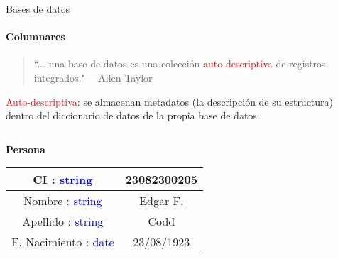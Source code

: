 \begin{frame}{Bases de datos}
    \framesubtitle{Columnares}

    \begin{overlayarea}{\linewidth}{\textheight}
        \begin{onlyenv}
            \begin{block}{}
            \begin{quote}
                ``... una base de datos es una colecci\'on \textcolor{red}{auto-descriptiva} de registros integrados."
                \hspace{1em plus 1fill}---Allen Taylor
            \end{quote}
    
            \textcolor{red}{Auto-descriptiva}: se almacenan metadatos (la descripci\'on de su estructura) dentro
            del diccionario de datos de la propia base de datos.
        \end{block}
      \end{onlyenv}
      
          \vspace{5mm}
      
        \begin{columns}
            \begin{column}[t]{0.5\textwidth}
          \centering

          \large \textbf{Persona}
          \vspace{2mm}

      \begin{tabular}{|c|c|}
          \hline
          CI : \textcolor{blue}{string} & 23082300205 \\ \hline
          Nombre : \textcolor{blue}{string} & Edgar F. \\\hline
          Apellido : \textcolor{blue}{string} & Codd \\\hline
          F. Nacimiento : \textcolor{blue}{date} & 23/08/1923 \\
          \hline
      \end{tabular}
    \end{column}
            \begin{column}[t]{0.5\textwidth}
            \end{column}
        \end{columns}

    \end{overlayarea}
\end{frame}



